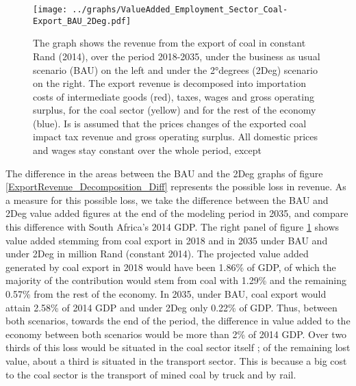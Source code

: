 \documentclass[12pt,english]{article}
\begin{document}
\begin{figure}[!t]
	\centering
	\hspace{-10pt}\texttt{[image: ../graphs/ValueAdded\_Employment\_Sector\_Coal-Export\_BAU\_2Deg.pdf]}
	\caption{\label{ValueAdded_Employment_Sector_Coal-Export_BAU_2Deg}\small The graph shows the revenue from the export of coal in constant Rand (2014), over the period 2018-2035, under the business as usual scenario (BAU) on the left and under the 2°degrees (2Deg) scenario on the right. The export revenue is decomposed into importation costs of intermediate goods (red), taxes, wages and gross operating surplus, for the coal sector (yellow) and for the rest of the economy (blue). Is is assumed that the prices changes of the exported coal impact tax revenue and gross operating surplus. All domestic prices and wages stay constant over the whole period, except  }
\end{figure}

The difference in the areas between the BAU and the 2Deg graphs of figure \ref{ExportRevenue_Decomposition_Diff} represents the possible loss in revenue. As a measure for this possible loss, we take the difference between the BAU and 2Deg value added figures at the end of the modeling period in 2035, and compare this difference with South Africa's 2014 GDP.%
The right panel of figure \ref{ValueAdded_Employment_Sector_Coal-Export_BAU_2Deg} shows value added stemming from coal export in 2018 and in 2035 under BAU and under 2Deg in million Rand (constant 2014). %
The projected value added generated by coal export in 2018 would have been 1.86\% of GDP, of which the majority of the contribution would stem from coal with 1.29\% and the remaining 0.57\% from the rest of the economy. In 2035, under BAU, coal export would attain 2.58\% of 2014 GDP and under 2Deg only 0.22\% of GDP. Thus, between both scenarios, towards the end of the period, the difference in value added to the economy between both scenarios would be more than 2\% of 2014 GDP. Over two thirds of this loss would be situated in the coal sector itself ; of the remaining lost value, about a third is situated in the transport sector. This is because a big cost to the coal sector is the transport of mined coal by truck and by rail. 
\end{document}
